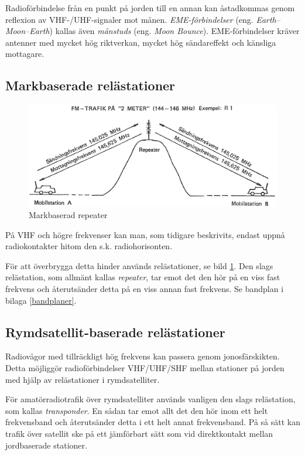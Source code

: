 Radioförbindelse från en punkt på jorden till en annan kan åstadkommas
genom reflexion av VHF-/UHF-signaler mot månen.
\emph{EME-förbindelser} (eng. \emph{Earth--Moon--Earth}) kallas även
\emph{månstuds} (eng. \emph{Moon Bounce}).
EME-förbindelser kräver antenner med mycket hög riktverkan, mycket hög
sändareffekt och känsliga mottagare.

\subsection{Markbaserade relästationer}

\begin{figure}
  \includegraphics[width=\textwidth]{images/cropped_pdfs/bild_2_7-12.pdf}
  \caption{Markbaserad repeater}
  \label{fig:bildII7-12}
\end{figure}

På VHF och högre frekvenser kan man, som tidigare beskrivits, endast
uppnå radiokontakter hitom den s.k. radiohorisonten.

För att överbrygga detta hinder används relästationer, se bild
\ref{fig:bildII7-12}.
Den slags relästation, som allmänt kallas \emph{repeater}, tar emot det den hör
på en viss fast frekvens och återutsänder detta på en viss annan fast frekvens.
Se bandplan i bilaga \ref{bandplaner}.

\subsection{Rymdsatellit-baserade relästationer}

Radiovågor med tillräckligt hög frekvens kan passera genom jonosfärskikten.
Detta möjliggör radioförbindelser VHF/UHF/SHF mellan
stationer på jorden med hjälp av relästationer i rymdsatelliter.

För amatörradiotrafik över rymdsatelliter används vanligen den slags
relästation, som kallas \emph{transponder}.
En sådan tar emot allt det den hör inom ett helt frekvensband och återutsänder
detta i ett helt annat frekvensband.
På så sätt kan trafik över satellit ske på ett jämförbart sätt som vid
direktkontakt mellan jordbaserade stationer.

